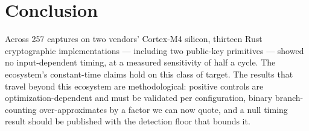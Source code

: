 \documentclass[11pt,a4paper]{article}
\begin{document}
\section{Conclusion}

Across 257 captures on two vendors' Cortex-M4 silicon, thirteen Rust
cryptographic implementations --- including two public-key primitives --- showed
no input-dependent timing, at a measured sensitivity of half a cycle. The
ecosystem's constant-time claims hold on this class of target. The results that
travel beyond this ecosystem are methodological: positive controls are
optimization-dependent and must be validated per configuration, binary
branch-counting over-approximates by a factor we can now quote, and a null
timing result should be published with the detection floor that bounds it.



\end{document}
